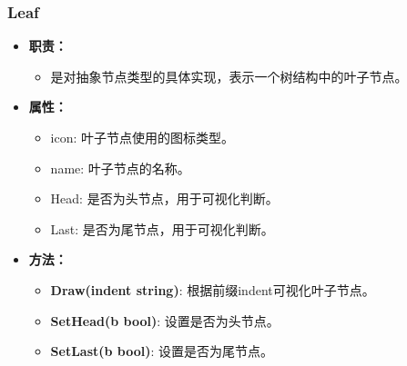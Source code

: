 \documentclass[hyperref,a4paper,UTF8]{ctexart}
\begin{document}
\subsubsection{Leaf}
\begin{itemize}
    \item \textbf{职责：}
    \begin{itemize}
        \item 是对抽象节点类型的具体实现，表示一个树结构中的叶子节点。
    \end{itemize}
    \item \textbf{属性：}
    \begin{itemize}
        \item icon: 叶子节点使用的图标类型。
        \item name: 叶子节点的名称。
        \item Head: 是否为头节点，用于可视化判断。
        \item Last: 是否为尾节点，用于可视化判断。
    \end{itemize}
    \item \textbf{方法：}
    \begin{itemize}
        \item \textbf{Draw(indent string)}: 根据前缀indent可视化叶子节点。
        \item \textbf{SetHead(b bool)}: 设置是否为头节点。
        \item \textbf{SetLast(b bool)}: 设置是否为尾节点。
    \end{itemize}
\end{itemize}
\end{document}
